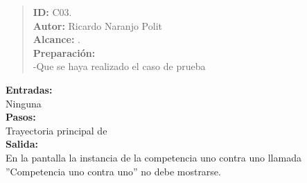 

\begin{quote} %
	\textbf{ID:} C03.\\
    \textbf{Autor: } Ricardo Naranjo Polit\\
	\textbf{Alcance:}  .\\
    \textbf{Preparación:}\\
      -Que se haya realizado el caso de prueba \\

\end{quote}

    \textbf{Entradas:}\\
    Ninguna\\
    \textbf{Pasos:}\\

    Trayectoria principal de \\

    \textbf{Salida:}\\

     En la pantalla  la instancia de la competencia uno contra uno llamada ''Competencia uno contra uno'' no debe mostrarse.
